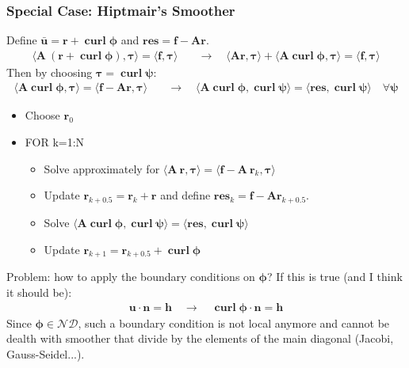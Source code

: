 \documentclass[8pt, oneside]{beamer}   	%
\newcommand{\bcurl}{\operatorname{\textbf{curl}}}
\newcommand{\bA}{\textbf{A}}
\newcommand{\bff}{\textbf{f}}
\newcommand{\bh}{\textbf{h}}
\newcommand{\bn}{\textbf{n}}
\newcommand{\br}{\textbf{r}}
\newcommand{\btau}{\boldsymbol{\tau}}
\newcommand{\bu}{\textbf{u}}
\newcommand{\bphi}{\boldsymbol{\phi}}
\newcommand{\bpsi}{\boldsymbol{\psi}}
\newcommand{\ND}{\mathcal{ND}}
\begin{document}
\begin{frame}
\frametitle{\textbf{Special Case: Hiptmair's Smoother}}
Define $\bar{\bu}=\br +\bcurl \bphi$ and $\textbf{res}=\bff-\bA\br$.
\begin{align}
 \langle \bA\: (\br + \bcurl \bphi) , \btau \rangle = \langle \bff , \btau \rangle 
\quad & \rightarrow \quad \langle \bA \br, \btau \rangle + \langle\bA \bcurl \bphi , \btau \rangle = \langle \bff , \btau \rangle 
\end{align}
Then by choosing $\btau= \bcurl \bpsi $:
\begin{align}
\langle\bA \bcurl \bphi , \btau \rangle = \langle \bff - \bA \br, \btau \rangle \quad & \rightarrow \quad
\langle \bA\bcurl \bphi , \bcurl \bpsi \rangle  =\langle \textbf{res} ,  \bcurl \bpsi \rangle  \quad \forall \bpsi
\end{align}
\begin{itemize}
\item Choose $\br_0$
\item FOR k=1:N 
\begin{itemize}
\item Solve approximately for $ \langle \bA\: \br  , \btau \rangle =\langle \bff -\bA\: \br_k , \btau \rangle $
\item  Update $\br_{k+0.5}=\br_{k} + \br$ and define $ \textbf{res}_k= \bff-\bA\br_{k+0.5}$. 
\item Solve $\langle \bA\bcurl \bphi , \bcurl \bpsi \rangle  =\langle \textbf{res} ,  \bcurl \bpsi \rangle $
\item Update $\br_{k+1}=\br_{k+0.5}+\bcurl \bphi$
\end{itemize}
\end{itemize}
Problem: how to apply the boundary conditions on $\bphi$? If this is true (and I think it should be):
\begin{align*}
\bu \cdot \bn = \bh \quad \to \quad \bcurl \bphi \cdot \bn = \bh
\end{align*}
Since $\bphi \in \ND$, such a boundary condition is not local anymore and cannot be dealth with smoother that divide by the elements of the main diagonal (Jacobi, Gauss-Seidel...).
\end{frame}
\end{document}
